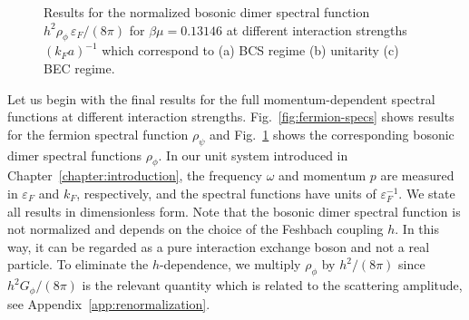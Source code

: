 \begin{figure}[h]
	\centering
	\caption[Boson spectral function $\rho_{\phi}$ at different interaction strengths]{Results for the normalized bosonic dimer spectral function $h^2\rho_{\phi}\,\varepsilon_F/(8\pi)$ for $\beta\mu=0.13146$ at different interaction strengths $(k_Fa)^{-1}$ which correspond to (a) BCS regime (b) unitarity (c) BEC regime.}
	\label{fig:boson-specs}
\end{figure}

Let us begin with the final results for the full momentum-dependent spectral functions at different interaction strengths. Fig.~\ref{fig:fermion-specs} shows results for the fermion spectral function $\rho_{\psi}$ and Fig.~\ref{fig:boson-specs} shows the corresponding bosonic dimer spectral functions $\rho_{\phi}$. In our unit system introduced in Chapter~\ref{chapter:introduction}, the frequency $\omega$ and momentum $p$ are measured in $\varepsilon_F$ and $k_F$, respectively, and the spectral functions have units of $\varepsilon^{-1}_F$. We state all results in dimensionless form. Note that the bosonic dimer spectral function is not normalized and depends on the choice of the Feshbach coupling $h$. In this way, it can be regarded as a pure interaction exchange boson and not a real particle. To eliminate the $h$-dependence, we multiply $\rho_{\phi}$ by $h^2/(8\pi)$ since $h^2G_{\phi}/(8\pi)$ is the relevant quantity which is related to the scattering amplitude, see Appendix~\ref{app:renormalization}.

